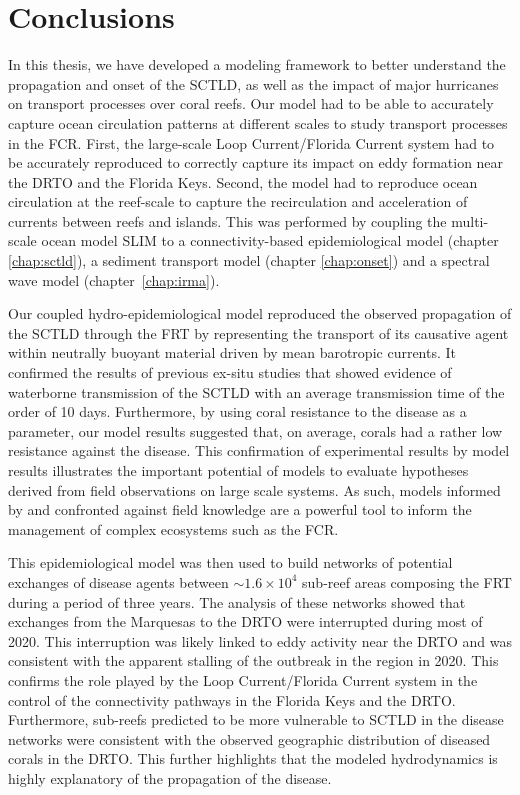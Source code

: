 \section{Conclusions}
In this thesis, we have developed a modeling framework to better understand the propagation and onset of the SCTLD, as well as the impact of major hurricanes on transport processes over coral reefs. Our model had to be able to accurately capture ocean circulation patterns at different scales to study transport processes in the FCR. First, the large-scale Loop Current/Florida Current system had to be accurately reproduced to correctly capture its impact on eddy formation near the DRTO and the Florida Keys. Second, the model had to reproduce ocean circulation at the reef-scale to capture the recirculation and acceleration of currents between reefs and islands. This was performed by coupling the multi-scale ocean model SLIM to a connectivity-based epidemiological model (chapter \ref{chap:sctld}), a sediment transport model (chapter \ref{chap:onset}) and a spectral wave model (chapter~\ref{chap:irma}).

Our coupled hydro-epidemiological model reproduced the observed propagation of the SCTLD through the FRT by representing the transport of its causative agent within neutrally buoyant material driven by mean barotropic currents. It confirmed the results of previous ex-situ studies that showed evidence of waterborne transmission of the SCTLD with an average transmission time of the order of 10 days. Furthermore, by using coral resistance to the disease as a parameter, our model results suggested that, on average, corals had a rather low resistance against the disease. This confirmation of experimental results by model results illustrates the important potential of models to evaluate hypotheses derived from field observations on large scale systems. As such, models informed by and confronted against field knowledge \citep{foster2012connectivity} are a powerful tool to inform the management of complex ecosystems such as the FCR.

This epidemiological model was then used to build networks of potential exchanges of disease agents between $\sim 1.6\times10^4$ sub-reef areas composing the FRT during a period of three years. The analysis of these networks showed that exchanges from the Marquesas to the DRTO were interrupted during most of 2020. This interruption was likely linked to eddy activity near the DRTO and was consistent with the apparent stalling of the outbreak in the region in 2020. This confirms the role played by the Loop Current/Florida Current system in the control of the connectivity pathways in the Florida Keys and the DRTO. Furthermore, sub-reefs predicted to be more vulnerable to SCTLD in the disease networks were consistent with the observed geographic distribution of diseased corals in the DRTO. This further highlights that the modeled hydrodynamics is highly explanatory of the propagation of the disease.

